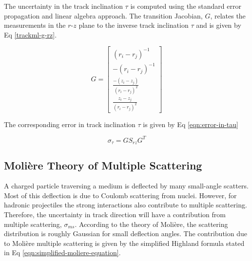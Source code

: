The uncertainty in the track inclination $\tau$ is computed using the standard error propagation and linear algebra approach. The transition Jacobian, $G$, relates the measurements in the $r$-$z$ plane to the inverse track inclination $\tau$ and is given by Eq \eqref{trackml-g-rz}.




\begin{equation}
    G = \begin{bmatrix} 
            (r_i - r_j)^{-1} \\
            -(r_i - r_j)^{-1} \\ 
            \frac{-(z_i - z_j)}{(r_i - r_j)^2} \\ 
            \frac{z_i - z_j}{(r_i - r_j)^2}
            \end{bmatrix} 
    \label{trackml-g-rz}
\end{equation}

The corresponding error in track inclination $\tau$ is given by Eq \eqref{eqn:error-in-tau}

\begin{equation}
    \sigma_{\tau} = G S_{rz} G^{T}
    \label{eqn:error-in-tau}
\end{equation}






\subsection{Moli\`ere Theory of Multiple Scattering}

A charged particle traversing a medium is deflected by many small-angle scatters. Most of this deflection is due to Coulomb scattering from nuclei. However, for hadronic projectiles the strong interactions also contribute to multiple scattering. Therefore, the uncertainty in track direction will have a contribution from multiple scattering, $\sigma_{ms}$. According to the theory of Moli\`ere, the scattering distribution is roughly Gaussian for small deflection angles. The contribution due to Moli\`ere multiple scattering is given by the simplified Highland formula \cite{moliere-theory-formula, Lynch:1990sq} stated in Eq \eqref{eqn:simplified-moliere-equation}.

